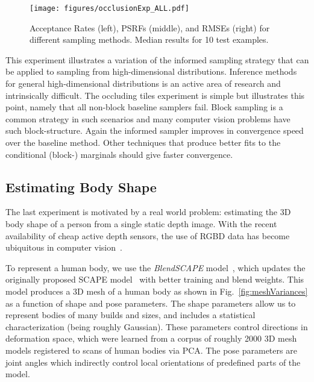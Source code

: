\begin{figure}[t]
\begin{center}
\centerline{\texttt{[image: figures/occlusionExp\_ALL.pdf]}}
  {Acceptance Rates (left), PSRFs (middle), and RMSEs (right)
  for different sampling methods. Median results for 10 test examples.}
\label{fig:occlusion_ALL}
\end{center}
\end{figure}

This experiment illustrates a variation of the informed sampling
strategy that can be applied to sampling from high-dimensional
distributions. Inference methods for general high-dimensional
distributions is an active area of research and intrinsically difficult.
The occluding tiles experiment is simple but illustrates this point,
namely that all non-block baseline samplers fail. Block sampling is a common
strategy in such scenarios and many computer vision problems have such
block-structure. Again the informed sampler improves in convergence
speed over the baseline method. Other techniques that produce better
fits to the conditional (block-) marginals should give faster
convergence.

\subsection{Estimating Body Shape}
\label{sec:bodyshape}

The last experiment is motivated by a real world problem: estimating
the 3D body shape of a person from a single static depth image. With
the recent availability of cheap active depth sensors, the use of RGBD
data has become ubiquitous in computer
vision~\cite{shao2013rgbd,han2013computervisionkinect}.

To represent a human body, we use
the \emph{BlendSCAPE} model~\cite{hirshberg2012coregistration}, which updates the
originally proposed SCAPE model~\cite{anguelov2005scape} with better
training and blend weights. This model produces a 3D mesh of a human
body as shown in Fig.~\ref{fig:meshVariances} as a function of
shape and pose parameters. The shape parameters allow us to represent
bodies of many builds and sizes, and includes a statistical
characterization (being roughly Gaussian). These parameters control
directions in deformation space, which were learned from a corpus of
roughly 2000 3D mesh models registered to scans of human bodies via
PCA. The pose parameters are joint angles which indirectly control
local orientations of predefined parts of the model.

